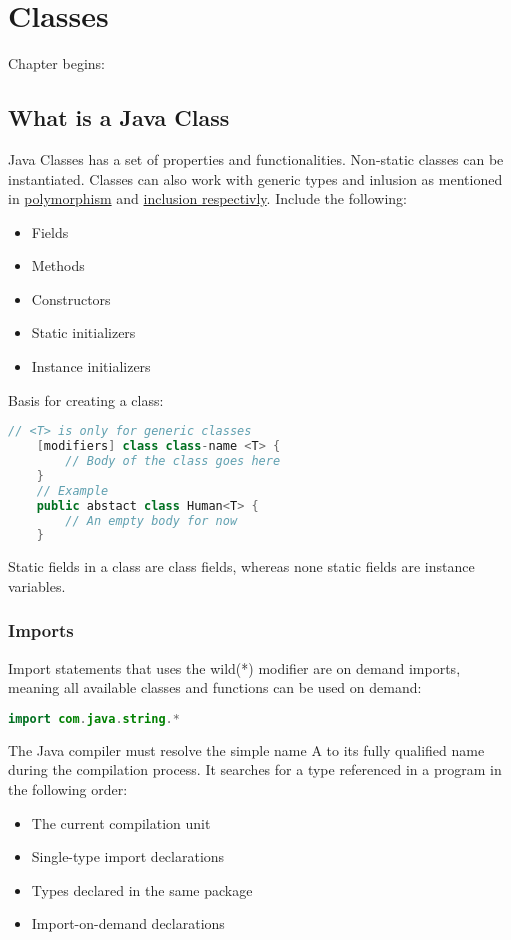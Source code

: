 \chapter{Classes}
Chapter begins: \jfun[225]

\section{What is a Java Class}
Java Classes has a set of properties and functionalities. Non-static classes can be instantiated. Classes can also work with generic types and inlusion as mentioned in \hyperref[sec:parametric_polymorphism]{polymorphism} and \hyperref[sec:inclusion_polymorphism]{inclusion respectivly}. Include the following:
\begin{itemize}
    \item Fields
    \item Methods
    \item Constructors
    \item Static initializers
    \item Instance initializers
\end{itemize}
Basis for creating a class:
\begin{lstlisting}[language=Java]
    // <T> is only for generic classes
    [modifiers] class class-name <T> {
        // Body of the class goes here
    }
    // Example
    public abstact class Human<T> {
        // An empty body for now
    }
\end{lstlisting}
Static fields in a class are class fields, whereas none static fields are instance variables.

\subsection*{Imports}
Import statements that uses the wild(*) modifier are on demand imports, meaning all available classes and functions can be used on demand:
\begin{lstlisting}[language=Java]
    import com.java.string.*
\end{lstlisting}
The Java compiler must resolve the simple name A to its fully qualified name during the compilation process. It searches for a type referenced in a program in the following order:
\begin{itemize}
    \item The current compilation unit
    \item Single-type import declarations
    \item Types declared in the same package
    \item Import-on-demand declarations
\end{itemize}

